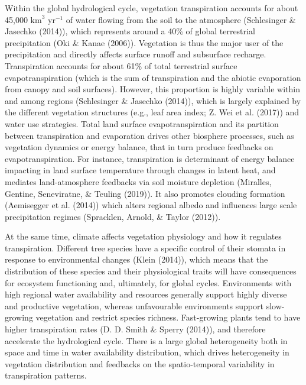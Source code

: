 \documentclass[11pt,twoside]{reedthesis}
\begin{document}
Within the global hydrological cycle, vegetation transpiration accounts
for about 45,000 \(\text{km}^3\) \(\text{yr}^{-1}\) of water flowing
from the soil to the atmosphere (Schlesinger \& Jasechko (2014)), which
represents around a 40\% of global terrestrial precipitation (Oki \&
Kanae (2006)). Vegetation is thus the major user of the precipitation
and directly affects surface runoff and subsurface recharge.
Transpiration accounts for about 61\% of total terrestrial surface
evapotranspiration (which is the sum of transpiration and the abiotic
evaporation from canopy and soil surfaces). However, this proportion is
highly variable within and among regions (Schlesinger \& Jasechko
(2014)), which is largely explained by the different vegetation
structures (e.g., leaf area index; Z. Wei et al. (2017)) and water use
strategies. Total land surface evapotranspiration and its partition
between transpiration and evaporation drives other biosphere processes,
such as vegetation dynamics or energy balance, that in turn produce
feedbacks on evapotranspiration. For instance, transpiration is
determinant of energy balance impacting in land surface temperature
through changes in latent heat, and mediates land-atmosphere feedbacks
via soil moisture depletion (Miralles, Gentine, Seneviratne, \& Teuling
(2019)). It also promotes clouding formation (Aemisegger et al. (2014))
which alters regional albedo and influences large scale precipitation
regimes (Spracklen, Arnold, \& Taylor (2012)).\par

At the same time, climate affects vegetation physiology and how it
regulates transpiration. Different tree species have a specific control
of their stomata in response to environmental changes (Klein (2014)),
which means that the distribution of these species and their
physiological traits will have consequences for ecosystem functioning
and, ultimately, for global cycles. Environments with high regional
water availability and resources generally support highly diverse and
productive vegetation, whereas unfavourable environments support
slow-growing vegetation and restrict species richness. Fast-growing
plants tend to have higher transpiration rates (D. D. Smith \& Sperry
(2014)), and therefore accelerate the hydrological cycle. There is a
large global heterogeneity both in space and time in water availability
distribution, which drives heterogeneity in vegetation distribution and
feedbacks on the spatio-temporal variability in transpiration
patterns.\par
\end{document}
